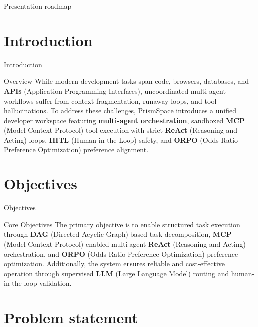 \documentclass[aspectratio=169,10pt]{beamer}
\begin{document}
\begin{frame}{Presentation roadmap}\tableofcontents\end{frame}

\section{Introduction}

\begin{frame}{Introduction}
\vspace{0.25cm}
\begin{block}{Overview}
\normalsize
While modern development tasks span code, browsers, databases, and \textbf{APIs} (Application Programming Interfaces), uncoordinated multi-agent workflows suffer from context fragmentation, runaway loops, and tool hallucinations. To address these challenges, PrismSpace introduces a unified developer workspace featuring \textbf{multi-agent orchestration}, sandboxed \textbf{MCP} (Model Context Protocol) tool execution with strict \textbf{ReAct} (Reasoning and Acting) loops, \textbf{HITL} (Human-in-the-Loop) safety, and \textbf{ORPO} (Odds Ratio Preference Optimization) preference alignment.
\end{block}
\end{frame}

\section{Objectives}

\begin{frame}{Objectives}
\vspace{0.25cm}
\begin{block}{Core Objectives}
\normalsize
The primary objective is to enable structured task execution through \textbf{DAG} (Directed Acyclic Graph)-based task decomposition, \textbf{MCP} (Model Context Protocol)-enabled multi-agent \textbf{ReAct} (Reasoning and Acting) orchestration, and \textbf{ORPO} (Odds Ratio Preference Optimization) preference optimization. Additionally, the system ensures reliable and cost-effective operation through supervised \textbf{LLM} (Large Language Model) routing and human-in-the-loop validation.
\end{block}
\end{frame}

\section{Problem statement}
\end{document}

